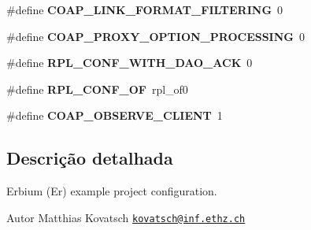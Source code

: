 \begin{DoxyCompactItemize}
\item 
\hypertarget{project-conf_8h_a89414d6478cb8ddbed6c1a44bb06014e}{\#define {\bfseries C\+O\+A\+P\+\_\+\+L\+I\+N\+K\+\_\+\+F\+O\+R\+M\+A\+T\+\_\+\+F\+I\+L\+T\+E\+R\+I\+N\+G}~0}\label{project-conf_8h_a89414d6478cb8ddbed6c1a44bb06014e}

\item 
\hypertarget{project-conf_8h_a70000cc8862dcde9bcf742f142a6e021}{\#define {\bfseries C\+O\+A\+P\+\_\+\+P\+R\+O\+X\+Y\+\_\+\+O\+P\+T\+I\+O\+N\+\_\+\+P\+R\+O\+C\+E\+S\+S\+I\+N\+G}~0}\label{project-conf_8h_a70000cc8862dcde9bcf742f142a6e021}

\item 
\hypertarget{project-conf_8h_aed383d82c438e6f6da89abb821dfc29c}{\#define {\bfseries R\+P\+L\+\_\+\+C\+O\+N\+F\+\_\+\+W\+I\+T\+H\+\_\+\+D\+A\+O\+\_\+\+A\+C\+K}~0}\label{project-conf_8h_aed383d82c438e6f6da89abb821dfc29c}

\item 
\hypertarget{project-conf_8h_a0c3bc93053ebf96d4b1daa2a9fb542a3}{\#define {\bfseries R\+P\+L\+\_\+\+C\+O\+N\+F\+\_\+\+O\+F}~rpl\+\_\+of0}\label{project-conf_8h_a0c3bc93053ebf96d4b1daa2a9fb542a3}

\item 
\hypertarget{project-conf_8h_a204fadd60d255b63620f1826bf030b60}{\#define {\bfseries C\+O\+A\+P\+\_\+\+O\+B\+S\+E\+R\+V\+E\+\_\+\+C\+L\+I\+E\+N\+T}~1}\label{project-conf_8h_a204fadd60d255b63620f1826bf030b60}

\end{DoxyCompactItemize}


\subsection{Descrição detalhada}
\begin{DoxyVerb} Erbium (Er) example project configuration.\end{DoxyVerb}
 

\begin{DoxyAuthor}{Autor}
Matthias Kovatsch \href{mailto:kovatsch@inf.ethz.ch}{\tt kovatsch@inf.\+ethz.\+ch} 
\end{DoxyAuthor}
